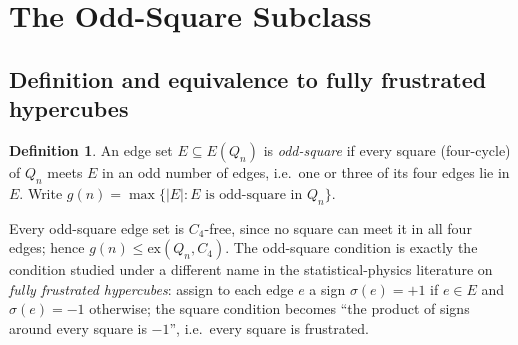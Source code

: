 \documentclass[12pt,a4paper]{article}
\theoremstyle{definition}
\newtheorem{definition}[theorem]{Definition}
\newcommand{\ex}{\mathrm{ex}}
\begin{document}
\section{The Odd-Square Subclass}\label{sec:oddsquare}

\subsection{Definition and equivalence to fully frustrated hypercubes}

\begin{definition}
An edge set $E\subseteq E(Q_n)$ is \emph{odd-square} if every square
(four-cycle) of $Q_n$ meets $E$ in an odd number of edges, i.e.\ one or
three of its four edges lie in $E$. Write
$g(n)=\max\{|E|:E\text{ is odd-square in }Q_n\}$.
\end{definition}

Every odd-square edge set is $C_4$-free, since no square can meet it in all
four edges; hence $g(n)\le\ex(Q_n,C_4)$. The odd-square condition is exactly
the condition studied under a different name in the statistical-physics
literature on \emph{fully frustrated hypercubes}: assign to each edge $e$ a
sign $\sigma(e)=+1$ if $e\in E$ and $\sigma(e)=-1$ otherwise; the square
condition becomes ``the product of signs around every square is $-1$'', i.e.\
every square is frustrated.
\end{document}

